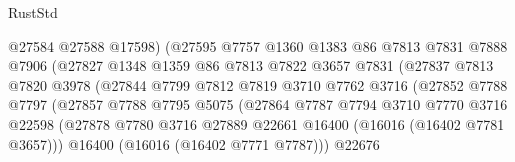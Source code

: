 \begin{lexlean}{RustStd}
\begin{coremodule}
                                  @27584
                                  @27588
                                  @17598)
                                (@27595
                                  @7757
                                  @1360
                                  @1383
                                  @86
                                  @7813
                                  @7831
                                  @7888
                                  @7906
                                  (@27827
                                    @1348
                                    @1359
                                    @86
                                    @7813
                                    @7822
                                    @3657
                                    @7831
                                    (@27837
                                      @7813
                                      @7820
                                      @3978
                                      (@27844
                                        @7799
                                        @7812
                                        @7819
                                        @3710
                                        @7762
                                        @3716
                                        (@27852
                                          @7788
                                          @7797
                                          (@27857
                                            @7788
                                            @7795
                                            @5075
                                            (@27864
                                              @7787
                                              @7794
                                              @3710
                                              @7770
                                              @3716
                                              @22598
                                              (@27878
                                                @7780
                                                @3716
                                                @27889
                                                @22661
                                                @16400
                                                (@16016 (@16402 @7781 @3657)))
                                              @16400
                                              (@16016 (@16402 @7771 @7787)))
                                            @22676

\end{coremodule}
\end{lexlean}

